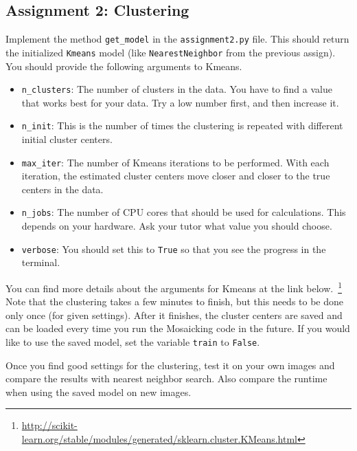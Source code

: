 \documentclass[a4paper]{article}
\begin{document}
	\subsection{Assignment 2: Clustering}
		Implement the method \verb|get_model| in the \verb|assignment2.py| file.
		This should return the initialized \verb|Kmeans| model (like \verb|NearestNeighbor| from the previous assign).
		You should provide the following arguments to Kmeans.
		\begin{itemize}
			\item \verb|n_clusters|: The number of clusters in the data. 
			You have to find a value that works best for your data. 
			Try a low number first, and then increase it.
			\item \verb|n_init|: This is the number of times the clustering is repeated with different initial cluster centers.
			\item \verb|max_iter|: The number of Kmeans iterations to be performed. 
			With each iteration, the estimated cluster centers move closer and closer to the true centers in the data.
			\item \verb|n_jobs|: The number of CPU cores that should be used for calculations. 
			This depends on your hardware. 
			Ask your tutor what value you should choose.
			\item \verb|verbose|: You should set this to \verb|True| so that you see the progress in the terminal.
		\end{itemize}
		You can find more details about the arguments for Kmeans at the link below.~\footnote{
			\url{http://scikit-learn.org/stable/modules/generated/sklearn.cluster.KMeans.html}
		}
		Note that the clustering takes a few minutes to finish, but this needs to be done only once (for given settings).
		After it finishes, the cluster centers are saved and can be loaded every time you run the Mosaicking code in the future.
		If you would like to use the saved model, set the variable \verb|train| to \verb|False|.
		
		Once you find good settings for the clustering, test it on your own images and compare the results with nearest neighbor search.
		Also compare the runtime when using the saved model on new images.
		
\end{document}

